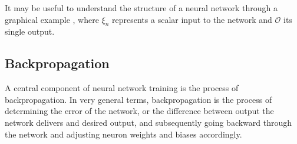 \documentclass{article}
\begin{document}
It may be useful to understand the structure of a neural network through a graphical example \cite{neurondiagrams}, where $\xi_n$ represents a scalar input to the network and $\mathcal{O}$ its single output.
\begin{center}
\end{center}

\subsection{Backpropagation}
A central component of neural network training is the process of backpropagation. In very general terms, backpropagation is the process of determining the error of the network, or the difference between output the network delivers and desired output, and subsequently going backward through the network and adjusting neuron weights and biases accordingly.
\end{document}
